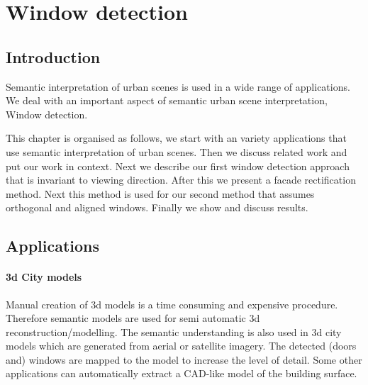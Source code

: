 



% 






\section{Window detection}
\label{sec:windowDetection}
\subsection{Introduction}
Semantic interpretation of urban scenes is used in a wide range of applications.
We deal with an important aspect of semantic urban scene interpretation, Window detection. 

This chapter is organised as follows, we start with an variety applications that
use semantic interpretation of urban scenes.  Then we discuss related work and
put our work in context.  Next we describe our first window detection approach
that is invariant to viewing direction.  After this we present a facade
rectification method. Next this method is used for our second method that assumes
orthogonal and aligned windows.  Finally we show and discuss results. 

\subsection{Applications}
\paragraph{3d City models} 
	Manual creation of 3d models is a time consuming and expensive procedure.
	Therefore semantic models are used for semi automatic 3d
	reconstruction/modelling.
	The semantic understanding is also used in 3d city models which are
	generated from aerial or satellite imagery.  The detected (doors and)
	windows are mapped to the model to increase the level of detail. 
	Some other applications can automatically extract a CAD-like model of
	the building surface.

